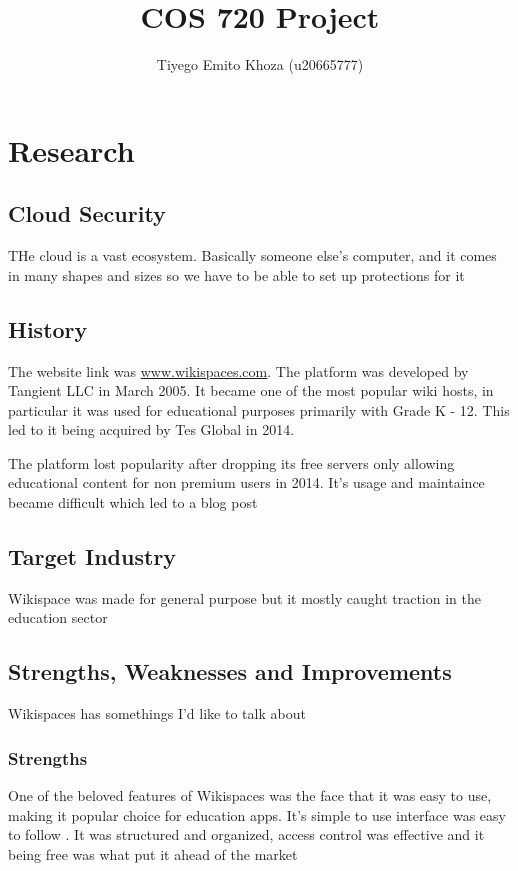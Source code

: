 \documentclass{article}
\title{COS 720 Project}
\author{Tiyego Emito Khoza (u20665777)}
\begin{document}
\maketitle

\section{Research}

\subsection{Cloud Security}
THe cloud is a vast ecosystem. Basically someone else's computer, and it comes in many shapes and sizes so we have to be able to set up protections for it

\subsection{History}
The website link was \href{www.wikispaces.com}{www.wikispaces.com}. The platform was developed by Tangient LLC in March 2005. It became one of the most popular wiki hosts, in particular it was used for educational purposes primarily with Grade K - 12. This led to it being acquired by Tes Global in 2014.

The platform lost popularity after dropping its free servers only allowing educational content for non premium users in 2014. It's usage and maintaince became difficult which led to a blog post \cite{GoodbyeWikispaces}

\subsection{Target Industry}
Wikispace was made for general purpose but it mostly caught traction in the education sector \cite{WhereToNext}

\subsection{Strengths, Weaknesses and Improvements}
Wikispaces has somethings I'd like to talk about

\subsubsection{Strengths}
One of the beloved features of Wikispaces  was the face that it was easy to use, making it popular choice for education apps. It's simple to use interface was easy to follow \cite{WikispacesTutorial}. It was structured and organized, access control was effective and it being free was what put it ahead of the market
\end{document}
